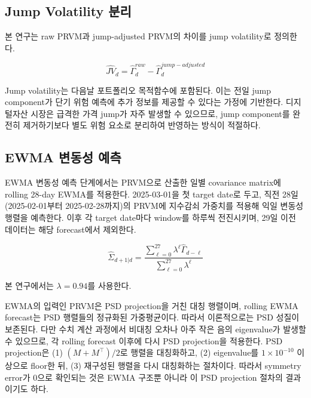 \documentclass[12pt,a4paper]{article}
\begin{document}

\subsection{Jump Volatility 분리}

본 연구는 raw PRVM과 jump-adjusted PRVM의 차이를 jump volatility로 정의한다.


\[
\widehat{JV}_d = \widehat{\Gamma}^{raw}_d - \widehat{\Gamma}^{jump-adjusted}_d
\]

Jump volatility는 다음날 포트폴리오 목적함수에 포함된다. 이는 전일 jump component가 단기 위험 예측에 추가 정보를 제공할 수 있다는 가정에 기반한다. 디지털자산 시장은 급격한 가격 jump가 자주 발생할 수 있으므로, jump component를 완전히 제거하기보다 별도 위험 요소로 분리하여 반영하는 방식이 적절하다.

\subsection{EWMA 변동성 예측}

EWMA 변동성 예측 단계에서는 PRVM으로 산출한 일별 covariance matrix에 rolling 28-day EWMA를 적용한다. 2025-03-01을 첫 target date로 두고, 직전 28일(2025-02-01부터 2025-02-28까지)의 PRVM에 지수감쇠 가중치를 적용해 익일 변동성 행렬을 예측한다. 이후 각 target date마다 window를 하루씩 전진시키며, 29일 이전 데이터는 해당 forecast에서 제외한다.


\[
\widehat{\Sigma}_{d+1|d}
=
\frac{\sum_{\ell=0}^{27}\lambda^\ell \widehat{\Gamma}_{d-\ell}}
{\sum_{\ell=0}^{27}\lambda^\ell}
\]

본 연구에서는 $\lambda = 0.94$를 사용한다.

EWMA의 입력인 PRVM은 PSD projection을 거친 대칭 행렬이며, rolling EWMA forecast는 PSD 행렬들의 정규화된 가중평균이다. 따라서 이론적으로는 PSD 성질이 보존된다. 다만 수치 계산 과정에서 비대칭 오차나 아주 작은 음의 eigenvalue가 발생할 수 있으므로, 각 rolling forecast 이후에 다시 PSD projection을 적용한다. PSD projection은 (1) $(M+M^\top)/2$로 행렬을 대칭화하고, (2) eigenvalue를 $1\times 10^{-10}$ 이상으로 floor한 뒤, (3) 재구성된 행렬을 다시 대칭화하는 절차이다. 따라서 symmetry error가 0으로 확인되는 것은 EWMA 구조뿐 아니라 이 PSD projection 절차의 결과이기도 하다.
\end{document}
